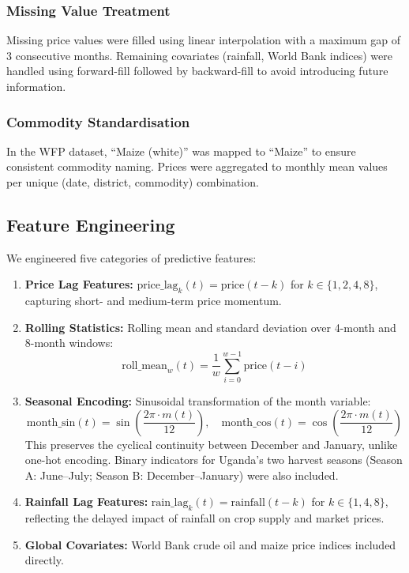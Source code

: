 \documentclass[12pt,a4paper]{article}
\begin{document}
\subsubsection{Missing Value Treatment}
Missing price values were filled using linear interpolation with a maximum gap of 3 consecutive months. Remaining covariates (rainfall, World Bank indices) were handled using forward-fill followed by backward-fill to avoid introducing future information.

\subsubsection{Commodity Standardisation}
In the WFP dataset, ``Maize (white)'' was mapped to ``Maize'' to ensure consistent commodity naming. Prices were aggregated to monthly mean values per unique (date, district, commodity) combination.

\subsection{Feature Engineering}
We engineered five categories of predictive features:

\begin{enumerate}
    \item \textbf{Price Lag Features:} $\text{price\_lag}_k(t) = \text{price}(t - k)$ for $k \in \{1, 2, 4, 8\}$, capturing short- and medium-term price momentum.
    
    \item \textbf{Rolling Statistics:} Rolling mean and standard deviation over 4-month and 8-month windows:
    \begin{equation}
        \text{roll\_mean}_w(t) = \frac{1}{w}\sum_{i=0}^{w-1} \text{price}(t-i)
    \end{equation}
    
    \item \textbf{Seasonal Encoding:} Sinusoidal transformation of the month variable:
    \begin{equation}
        \text{month\_sin}(t) = \sin\left(\frac{2\pi \cdot m(t)}{12}\right), \quad \text{month\_cos}(t) = \cos\left(\frac{2\pi \cdot m(t)}{12}\right)
    \end{equation}
    This preserves the cyclical continuity between December and January, unlike one-hot encoding. Binary indicators for Uganda's two harvest seasons (Season A: June--July; Season B: December--January) were also included.
    
    \item \textbf{Rainfall Lag Features:} $\text{rain\_lag}_k(t) = \text{rainfall}(t - k)$ for $k \in \{1, 4, 8\}$, reflecting the delayed impact of rainfall on crop supply and market prices.
    
    \item \textbf{Global Covariates:} World Bank crude oil and maize price indices included directly.
\end{enumerate}
\end{document}
